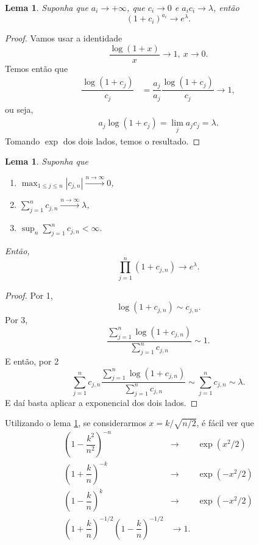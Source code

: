 \documentclass[12pt,a4paper,oneside]{book}
\newtheorem{lemma}[theorem]{Lema}
\theoremstyle{definition}
\theoremstyle{remark}
\numberwithin{equation}{section}
\newcommand{\ds}{\displaystyle}
\newcommand{\rarrowlimn}{\xrightarrow{n\rightarrow \infty}}
\begin{document}
\begin{lemma}\label{lema-limitefundamental-convergenciaparaexponencial}
Suponha que $a_i \rightarrow +\infty $, que $c_i\rightarrow 0 $ e $a_ic_i \rightarrow \lambda$, então
$$\left( 1 + c_i \right)^{a_i} \rightarrow e^{\lambda}. $$
\end{lemma}
\begin{proof}
Vamos usar a identidade 
$$\dfrac{\log(1+x)}{x}\rightarrow 1,\ x\rightarrow 0. $$
Temos então que
\begin{align*}
\dfrac{\log(1+c_j)}{c_j} &=\dfrac{a_j}{a_j}\dfrac{\log(1+c_j)}{c_j} \rightarrow 1,
\end{align*}
ou seja,
\begin{align*}
a_j\log(1+c_j)= \lim_ja_jc_j =\lambda.
\end{align*}
Tomando $\exp$ dos dois lados, temos o resultado.
\end{proof}
\begin{lemma}\label{lema-limitefundamental-convergenciaparaexponencial-GENERALIZADA}
Suponha que 
\begin{enumerate}
\item $\ds\max_{1\leq j\leq n}|c_{j,n}|\rarrowlimn 0$,
\item $\ds\sum^{n}_{j=1}c_{j,n} \rarrowlimn \lambda$,
\item $\ds \sup_n \ds\sum^n_{j=1}c_{j,n}<\infty.$
\end{enumerate}
Então,
$$\prod^n_{j=1}(1+c_{j,n})\rightarrow e^\lambda. $$
\end{lemma}

\begin{proof}
Por 1, $${\log(1+c_{j,n})}\sim {c_{j,n}}.$$
Por 3,
$$\dfrac{\sum_{j=1}^n \log(1+c_{j,n})}{\sum_{j=1}^n c_{j,n}}\sim 1. $$
E então, por 2
$$\sum_{j=1}^n c_{j,n}\dfrac{\sum_{j=1}^n \log(1+c_{j,n})}{\sum_{j=1}^n c_{j,n}}\sim \sum_{j=1}^n c_{j,n}\sim \lambda. $$
E daí basta aplicar a exponencial dos dois lados.

\end{proof}









Utilizando o lema \ref{lema-limitefundamental-convergenciaparaexponencial}, se considerarmos $x = k/\sqrt{n/2}$, é fácil ver que
$$
\begin{array}{cll}
\left( 1-\dfrac{k^2}{n^2} \right)^{-n} &\longrightarrow& \exp(x^2/2) \\
\left( 1+\dfrac{k}{n} \right)^{-k}&\longrightarrow& \exp(-x^2/2)\\
\left( 1-\dfrac{k}{n} \right)^{k}&\longrightarrow& \exp(-x^2/2)\\
\left( 1+\dfrac{k}{n} \right)^{-1/2}\left( 1-\dfrac{k}{n} \right)^{-1/2}&\longrightarrow 1.
\end{array}
$$
\end{document}

